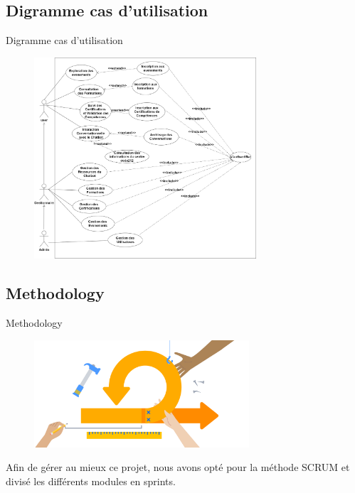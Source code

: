 \documentclass{beamer}
\begin{document}
\subsection{Digramme cas d'utilisation}
\begin{frame}{Digramme cas d'utilisation}
 \begin{figure}[htpb]
        \centering
        \includegraphics[height=7.5cm]{pic/usecase.png}
    \end{figure}
\end{frame}


\subsection{Methodology}
\begin{frame}{Methodology}
    
    \begin{figure}[htpb]
        \centering
        \includegraphics[height=4cm]{pic/scrum.png}
    \end{figure}

    Afin de gérer au mieux ce projet, nous avons opté pour la méthode SCRUM et divisé les différents modules en sprints.
\end{frame}
\end{document}
